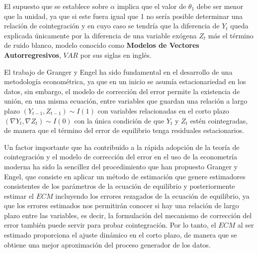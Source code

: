 El supuesto que se establece sobre $\alpha$ implica que el valor de $\theta_1$ debe ser menor que la unidad, ya que si este fuera igual que 1 no sería posible determinar una   relación de cointegración   y en cuyo caso se tendría que la diferencia de $Y_t$ queda explicada únicamente por la diferencia de una  variable exógena $Z_t$ más el término de ruido blanco, modelo conocido como \textbf{Modelos de Vectores Autorregresivos}, $VAR$ por sus siglas en inglés. \bigskip


El trabajo de Granger y Engel ha sido fundamental en el desarrollo de una metodología econométrica, ya que en un inicio se asumía estacionariedad en los datos, sin embargo, el modelo de corrección del error permite la existencia de unión, en una misma ecuación,  entre variables que guardan una relación a largo plazo $(Y_{t-1},Z_{t-1}) \sim I(1)$ con variables relacionadas en el corto plazo $(\nabla Y_t, \nabla Z_t) \sim I(0)$ con la única condición de que $Y_t$ y $Z_t$ estén cointegradas, de manera que el término del error de equilibrio tenga residuales estacionarios. \bigskip

Un factor importante que ha contribuido a la rápida adopción de la teoría de cointegración y el modelo de corrección del error en el uso de la econometría moderna ha sido la sencillez del procedimiento que han propuesto Granger y Engel, que consiste en aplicar un método de estimación que genere estimadores consistentes de los parámetros de la ecuación de equilibrio y posteriormente estimar el $ECM$ incluyendo los errores rezagados de la ecuación de equilibrio, ya que los errores estimados nos permitirán conocer si hay una relación de largo plazo entre las variables, es decir, la formulación del mecanismo de corrección del error también puede servir para probar cointegración. Por lo tanto, el $ECM$ al ser estimado proporciona el ajuste dinámico en el corto plazo, de manera que se obtiene una mejor aproximación del proceso generador de los datos.  
 
